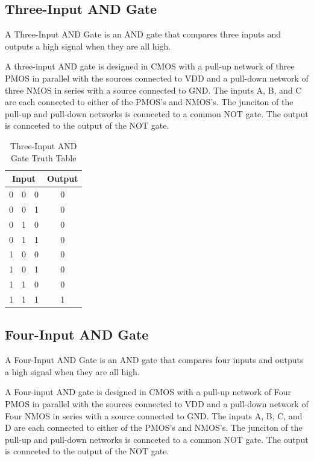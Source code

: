 \documentclass[conference]{IEEEtran}
\begin{document}
\subsection{Three-Input AND Gate}

A Three-Input AND Gate is an AND gate that compares three inputs and outputs a high signal when they are all high.

A three-input AND gate is designed in CMOS with a pull-up network of three PMOS in parallel with the sources connected to VDD and a pull-down network of three NMOS in series with a source connected to GND. The inputs A, B, and C are each connected to either of the PMOS's and NMOS's. The junciton of the pull-up and pull-down networks is connceted to a common NOT gate. The output is connceted to the output of the NOT gate.

\begin{table}[htbp]
\caption{Three-Input AND Gate Truth Table}
\begin{center}
\begin{tabular}{|c|c|c|c|}
\hline
\multicolumn{3}{|c|}{\textbf{Input}} & \textbf{Output} \\
\hline
0 & 0 & 0 & 0 \\
\hline
0 & 0 & 1 & 0 \\
\hline
0 & 1 & 0 & 0 \\
\hline
0 & 1 & 1 & 0 \\
\hline
1 & 0 & 0 & 0 \\
\hline
1 & 0 & 1 & 0 \\
\hline
1 & 1 & 0 & 0 \\
\hline
1 & 1 & 1 & 1 \\
\hline
\end{tabular}
\end{center}
\end{table}

\subsection{Four-Input AND Gate}

A Four-Input AND Gate is an AND gate that compares four inputs and outputs a high signal when they are all high.

A Four-input AND gate is designed in CMOS with a pull-up network of Four PMOS in parallel with the sources connected to VDD and a pull-down network of Four NMOS in series with a source connected to GND. The inputs A, B, C, and D are each connected to either of the PMOS's and NMOS's. The junciton of the pull-up and pull-down networks is connceted to a common NOT gate. The output is connceted to the output of the NOT gate.
\end{document}
